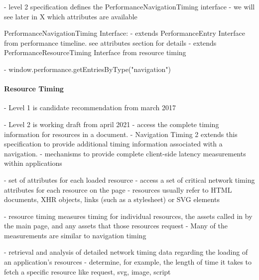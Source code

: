 
- level 2 specification defines the PerformanceNavigationTiming interface
- we will see later in X which attributes are available


PerformanceNavigationTiming Interface: 
- extends PerformanceEntry Interface from performance timeline. see attributes section for details
- extends PerformanceResourceTiming Interface from resource timing


- window.performance.getEntriesByType("navigation")






\paragraph{Resource Timing}





- Level 1 is candidate recommendation from march 2017

- Level 2 is working draft from april 2021
- access the complete timing information for resources in a document.
- Navigation Timing 2 extends this specification to provide additional timing information associated with a navigation.
- mechanisms to provide complete client-side latency measurements within applications


- set of attributes for each loaded resource
- access a set of critical network timing attributes for each resource on the page
- resources usually refer to HTML documents, XHR objects, links (such as a stylesheet) or SVG elements


- resource timing measures timing for individual resources, the assets called in by the main page, and any assets that those resources request
- Many of the measurements are similar to navigation timing


- retrieval and analysis of detailed network timing data regarding the loading of an application's resources
- determine, for example, the length of time it takes to fetch a specific resource like request, svg, image, script


